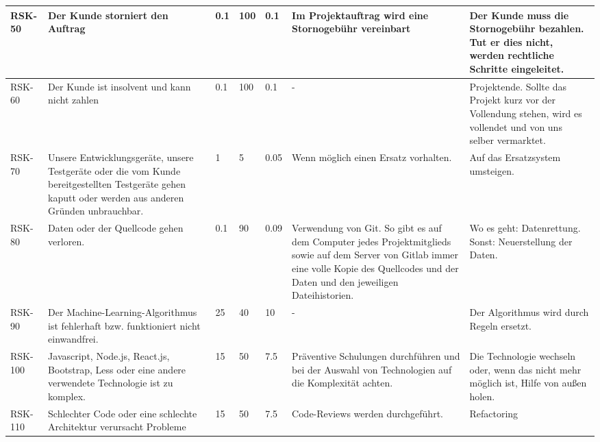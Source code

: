\begin{landscape}
\begin{longtable}{|p{1.5cm}|p{4.5cm}|p{0.4cm}|p{0.4cm}|p{0.8cm}|p{4.5cm}|p{4.5cm}|}
		\\ \hline

		RSK-50 	& Der Kunde storniert den Auftrag 
				& 0.1 	& 100 	& 0.1 	& Im Projektauftrag wird eine Stornogebühr vereinbart 
								& Der Kunde muss die Stornogebühr bezahlen. Tut er dies nicht, werden rechtliche Schritte eingeleitet.

		\\ \hline
		
		RSK-60 	& Der Kunde ist insolvent und kann nicht zahlen
				& 0.1 	& 100 	& 0.1 	& - 	& Projektende. Sollte das Projekt kurz vor der Vollendung stehen, wird es vollendet und von uns selber vermarktet.

		\\ \hline 

		RSK-70 	& Unsere Entwicklungsgeräte, unsere Testgeräte oder die vom Kunde bereitgestellten Testgeräte gehen kaputt oder werden aus anderen Gründen unbrauchbar.
				& 1 	& 5 	& 0.05 	& Wenn möglich einen Ersatz vorhalten.
								& Auf das Ersatzsystem umsteigen.

		\\ \hline

		RSK-80 	& Daten oder der Quellcode gehen verloren.
				& 0.1 	& 90 	& 0.09 	& Verwendung von Git. So gibt es auf dem Computer jedes Projektmitglieds sowie auf dem Server von Gitlab immer eine volle Kopie des Quellcodes und der Daten und den jeweiligen Dateihistorien.
								& Wo es geht: Datenrettung. Sonst: Neuerstellung der Daten.

		\\ \hline 

		

		RSK-90	& Der Machine-Learning-Algorithmus ist fehlerhaft bzw. funktioniert nicht einwandfrei.
				& 25 	& 40 &	10 	& -
								& Der Algorithmus wird durch Regeln ersetzt.

		\\ \hline

		RSK-100	& Javascript, Node.js, React.js, Bootstrap, Less oder eine andere verwendete Technologie ist zu komplex.
				& 15 	& 50 	& 7.5 	& Präventive Schulungen durchführen und bei der Auswahl von Technologien auf die Komplexität achten. 
								& Die Technologie wechseln oder, wenn das nicht mehr möglich ist, Hilfe von außen holen.

		\\ \hline

		RSK-110	& Schlechter Code oder eine schlechte Architektur verursacht Probleme
				& 15 	& 50 	& 7.5 	& Code-Reviews werden durchgeführt.
								& Refactoring


\end{longtable}
\end{landscape}
